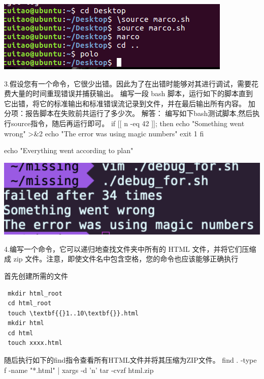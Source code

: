 \documentclass{article}
\begin{document}
 


\noindent
\begin{minipage}{\linewidth}
  \centering
  \includegraphics[width=0.5\linewidth]{Shell2.png}
  \label{fig:example}
\end{minipage}

3.假设您有一个命令，它很少出错。因此为了在出错时能够对其进行调试，需要花费大量的时间重现错误并捕获输出。 编写一段 bash 脚本，运行如下的脚本直到它出错，将它的标准输出和标准错误流记录到文件，并在最后输出所有内容。 加分项：报告脚本在失败前共运行了多少次。 
\newline
解答：
 编写如下bash测试脚本,然后执行source指令，随后再运行即可。\newline
 \newline\newline\newline
 if [[ n -eq 42 ]]; then\newline
     echo "Something went wrong"\newline
     >\&2 echo "The error was using magic numbers"\newline
     exit 1\newline
 fi\newline

 echo "Everything went according to plan"\newline
~                                           

\noindent
\begin{minipage}{\linewidth}
  \centering
  \includegraphics[width=0.5\linewidth]{Shell3.png}
  \label{fig:example}
\end{minipage}

4.编写一个命令，它可以递归地查找文件夹中所有的 HTML 文件，并将它们压缩成 zip 文件。注意，即使文件名中包含空格，您的命令也应该能够正确执行 \newline

首先创建所需的文件 \newline
\begin{verbatim}
 mkdir html_root 
 cd html_root
 touch \textbf{{}1..10\textbf{}}.html
 mkdir html
 cd html 
 touch xxxx.html
\end{verbatim}
 \newline
 随后执行如下的find指令查看所有HTML文件并将其压缩为ZIP文件。\newline
 find . -type f -name "*.html" | xargs -d 'n'  tar -cvzf html.zip\newline
 
\end{document}
